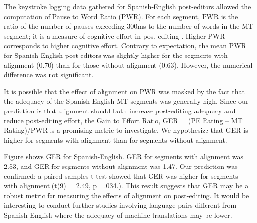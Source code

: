 

The keystroke logging data gathered for Spanish-English post-editors allowed the computation of Pause to Word Ratio (PWR). For each segment, PWR is the ratio of the number of pauses exceeding 300ms to the number of words in the MT segment; it is a measure of cognitive effort in post-editing \citep{2014_Lacruz_Shreve}. Higher PWR corresponds to higher cognitive effort.
%
%
Contrary to expectation, the mean PWR for Spanish-English post-editors was slightly higher for the segments with alignment (0.70) than for those without alignment (0.63). However, the numerical difference was not significant. 

It is possible that the effect of alignment on PWR was masked by the fact that the adequacy of the Spanish-English MT segments was generally high. Since our prediction is that alignment should both increase post-editing adequacy and reduce post-editing effort, the Gain to Effort Ratio, GER = (PE Rating – MT Rating)/PWR is a promising metric to investigate. We hypothesize that GER is higher for segments with alignment than for segments without alignment. 

Figure   shows GER for Spanish-English.
%
GER for segments with alignment was 2.53, and GER for segments without alignment was 1.47. Our prediction was confirmed: a paired samples t-test showed that GER was higher for segments with alignment (t(9) = 2.49, p =.034.).
%
%
%
This result suggests that GER may be a robust metric for measuring the effects of alignment on post-editing. It would be interesting to conduct further studies involving language pairs different from Spanish-English where the adequacy of machine translations may be lower.














